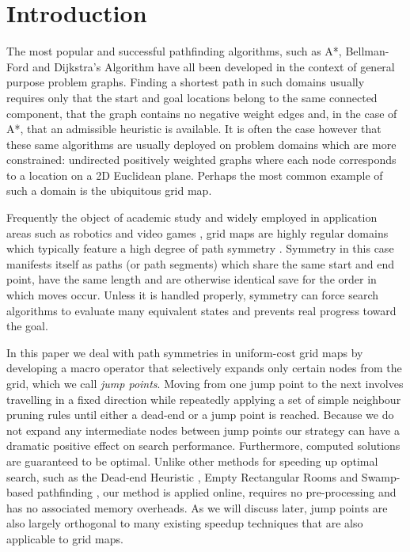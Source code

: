 \section{Introduction}
The most popular and successful pathfinding algorithms, such as A*, Bellman-Ford
and Dijkstra's Algorithm have all been developed in the context of general
purpose problem graphs.  Finding a shortest path in such domains usually
requires only that the start and goal locations belong to the same connected
component, that the graph contains no negative weight edges and, in the case of
A*, that an admissible heuristic is available.  It is often the case however
that these same algorithms are usually deployed on problem domains which are
more constrained: undirected positively weighted graphs where each node
corresponds to a location on a 2D Euclidean plane.
Perhaps the most common example of such a domain is the ubiquitous grid map.

Frequently the object of academic study \cite{yap02,botea04,bjornsson06} and
widely employed in application areas such as robotics \cite{choset05} and video
games \cite{sturtevant07}, grid maps are highly regular domains which
typically feature a high degree of path symmetry \cite{harabor10,pochter10}.
Symmetry in this case manifests itself as paths (or path segments) which share
the same start and end point, have the same length and are otherwise identical
save for the order in which moves occur.
Unless it is handled properly, symmetry can force search algorithms 
to evaluate many equivalent states and prevents real progress toward
the goal.

In this paper we deal with path symmetries in uniform-cost grid maps by 
developing a macro operator that selectively expands only certain nodes from the grid, 
which we call
\emph{jump points}. Moving from one jump point to the next involves travelling
in a fixed direction while repeatedly applying a set of simple neighbour pruning
rules until either a dead-end or a jump point is reached.  Because we do not
expand any intermediate nodes between jump points our strategy can have a
dramatic positive effect on search performance.  Furthermore, computed solutions
are guaranteed to be optimal.  Unlike other methods for speeding up
optimal search, such as the Dead-end Heuristic \cite{bjornsson06}, Empty
Rectangular Rooms \cite{harabor10} and Swamp-based pathfinding \cite{pochter10},
our method is applied online, requires no pre-processing and has no associated
memory overheads.  As we will discuss later, jump points are also largely
orthogonal to many existing speedup techniques that are also applicable to grid
maps.

